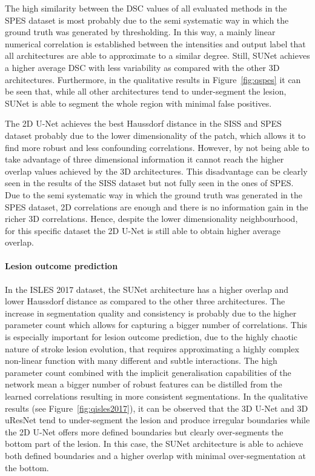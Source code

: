 \documentclass[letterpaper,final,authoryear,3p,times,twocolumn]{elsarticle}
\begin{document}
The high similarity between the DSC values of all evaluated methods in the SPES dataset is most probably due to the semi systematic way in which the ground truth was generated by thresholding. In this way, a mainly linear numerical correlation is established between the intensities and output label that all architectures are able to approximate to a similar degree. Still, SUNet achieves a higher average DSC with less variability as compared with the other 3D architectures. Furthermore, in the qualitative results in Figure~\ref{fig:qspes} it can be seen that, while all other architectures tend to under-segment the lesion, SUNet is able to segment the whole region with minimal false positives.

The 2D U-Net achieves the best Haussdorf distance in the SISS and SPES dataset probably due to the lower dimensionality of the patch, which allows it to find more robust and less confounding correlations. However, by not being able to take advantage of three dimensional information it cannot reach the higher overlap values achieved by the 3D architectures. This disadvantage can be clearly seen in the results of the SISS dataset but not fully seen in the ones of SPES. Due to the semi systematic way in which the ground truth was generated in the SPES dataset, 2D correlations are enough and there is no information gain in the richer 3D correlations. Hence, despite the lower dimensionality neighbourhood, for this specific dataset the 2D U-Net is still able to obtain higher average overlap. 


\paragraph{Lesion outcome prediction} 
In the ISLES 2017 dataset, the SUNet architecture has a higher overlap and lower Haussdorf distance as compared to the other three architectures. The increase in segmentation quality and consistency is probably due to the higher parameter count which allows for capturing a bigger number of correlations. This is especially important for lesion outcome prediction, due to the highly chaotic nature of stroke lesion evolution, that requires approximating a highly complex non-linear function with many different and subtle interactions. The high parameter count combined with the implicit generalisation capabilities of the network mean a bigger number of robust features can be distilled from the learned correlations resulting in more consistent segmentations. In the qualitative results (see Figure~\ref{fig:qisles2017}), it can be observed that the 3D U-Net and 3D uResNet tend to under-segment the lesion and produce irregular boundaries while the 2D U-Net offers more defined boundaries but clearly over-segments the bottom part of the lesion. In this case, the SUNet architecture is able to achieve both defined boundaries and a higher overlap with minimal over-segmentation at the bottom.
\end{document}
